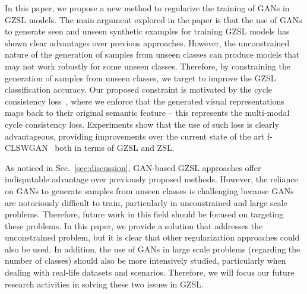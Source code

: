 \documentclass[runningheads]{llncs}
\begin{document}
In this paper, we propose a new method to regularize the training of GANs in GZSL models.  The main argument explored in the paper is that the use of GANs to generate seen and unseen synthetic examples for training GZSL models has shown clear advantages over previous approaches.  However, the unconstrained nature of the generation of samples from unseen classes can produce models that may not work robustly for some unseen classes.  Therefore, by constraining the generation of samples from unseen classes, we target to improve the GZSL classification accuracy.  Our proposed constraint is motivated by the cycle consistency loss~\cite{CycleGAN2017}, where we enforce that the generated visual representations maps back to their original semantic feature -- this represents the multi-modal cycle consistency loss.
Experiments show that the use of such loss is clearly advantageous, providing improvements over the current state of the art f-CLSWGAN~\cite{XianCVPR2018} both in terms of GZSL and ZSL.

As noticed in Sec.~\ref{sec:discussion}, GAN-based GZSL approaches offer indisputable advantage over previously proposed methods.  However, the reliance on GANs to generate samples from unseen classes is challenging because GANs are notoriously difficult to train, particularly in unconstrained and large scale problems.  Therefore, future work in this field should be focused on targeting these problems.  In this paper, we provide a solution that addresses the unconstrained problem, but it is clear that other regularization approaches could also be used.  In addition, the use of GANs in large scale problems (regarding the number of classes) should also be more intensively studied, particularly when dealing with real-life datasets and scenarios.  Therefore, we will focus our future research activities in solving these two issues in GZSL.




\end{document}

